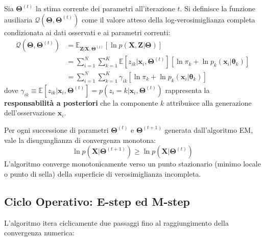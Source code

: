 Sia $\boldsymbol{\Theta}^{(t)}$ la stima corrente dei parametri all'iterazione $t$. Si definisce la funzione ausiliaria $\mathcal{Q}(\boldsymbol{\Theta}, \boldsymbol{\Theta}^{(t)})$ come il valore atteso della log-verosimiglianza completa condizionata ai dati osservati e ai parametri correnti:
\begin{align}
\label{eq:dm-q-function}
\mathcal{Q}(\boldsymbol{\Theta}, \boldsymbol{\Theta}^{(t)}) &= \mathbb{E}_{\mathbf{Z} | \mathbf{X}, \boldsymbol{\Theta}^{(t)}} \left[ \ln p(\mathbf{X}, \mathbf{Z} | \boldsymbol{\Theta}) \right] \nonumber \\
&= \sum_{i=1}^N \sum_{k=1}^K \mathbb{E}[z_{ik} | \mathbf{x}_i, \boldsymbol{\Theta}^{(t)}] \left[ \ln \pi_k + \ln p_k(\mathbf{x}_i | \boldsymbol{\theta}_k) \right] \nonumber \\
&= \sum_{i=1}^N \sum_{k=1}^K \gamma_{ik} \left[ \ln \pi_k + \ln p_k(\mathbf{x}_i | \boldsymbol{\theta}_k) \right]
\end{align}
dove $\gamma_{ik} \equiv \mathbb{E}[z_{ik} | \mathbf{x}_i, \boldsymbol{\Theta}^{(t)}] = p(z_i = k | \mathbf{x}_i, \boldsymbol{\Theta}^{(t)})$ rappresenta la \textbf{responsabilità a posteriori} che la componente $k$ attribuisce alla generazione dell'osservazione $\mathbf{x}_i$.

\begin{theorem}
Per ogni successione di parametri $\boldsymbol{\Theta}^{(t)}$ e $\boldsymbol{\Theta}^{(t+1)}$ generata dall'algoritmo EM, vale la disuguaglianza di convergenza monotona:
\begin{equation}
\ln p(\mathbf{X} | \boldsymbol{\Theta}^{(t+1)}) \ge \ln p(\mathbf{X} | \boldsymbol{\Theta}^{(t)})
\end{equation}
L'algoritmo converge monotonicamente verso un punto stazionario (minimo locale o punto di sella) della superficie di verosimiglianza incompleta.
\end{theorem}

\subsection{Ciclo Operativo: E-step ed M-step}

L'algoritmo itera ciclicamente due passaggi fino al raggiungimento della convergenza numerica:

